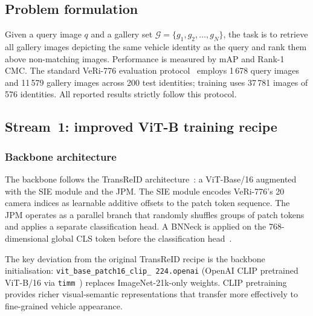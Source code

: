 \documentclass[10pt,a4paper]{article}
\begin{document}
\subsection{Problem formulation}
Given a query image $q$ and a gallery set
$\mathcal{G} = \{g_1, g_2, \ldots, g_N\}$, the task is to retrieve all gallery
images depicting the same vehicle identity as the query and rank them above
non-matching images. Performance is measured by mAP and Rank-1 CMC. The
standard VeRi-776 evaluation protocol~\cite{liu2018provid} employs 1\,678 query
images and 11\,579 gallery images across 200 test identities; training uses
37\,781 images of 576 identities. All reported results strictly follow this
protocol.

\subsection{Stream~1: improved ViT-B training recipe}

\subsubsection{Backbone architecture}
The backbone follows the TransReID architecture~\cite{he2021transreid}: a
ViT-Base/16 augmented with the SIE module and the JPM. The SIE module encodes
VeRi-776's 20 camera indices as learnable additive offsets to the patch token
sequence. The JPM operates as a parallel branch that randomly shuffles groups
of patch tokens and applies a separate classification head. A BNNeck is applied
on the 768-dimensional global CLS token before the classification
head~\cite{he2021transreid}.

The key deviation from the original TransReID recipe is the backbone
initialisation: \texttt{vit\_base\_\allowbreak patch16\_\allowbreak clip\_\allowbreak
224.openai} (OpenAI CLIP pretrained ViT-B/16 via
\texttt{timm}~\cite{radford2021clip}) replaces
ImageNet-21k-only weights. CLIP pretraining provides richer visual-semantic
representations that transfer more effectively to fine-grained vehicle
appearance.
\end{document}
